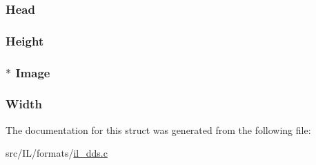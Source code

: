 \hypertarget{struct_d_d_s___c_o_n_t_e_x_t_a2bc50ce693cbf4803e197d1355bf300f}{
\subsubsection[{Head}]{ Head}}\label{struct_d_d_s___c_o_n_t_e_x_t_a2bc50ce693cbf4803e197d1355bf300f}
\hypertarget{struct_d_d_s___c_o_n_t_e_x_t_a6ab8e5a8c7842b5a57104e36b9a49f33}{
\subsubsection[{Height}]{ Height}}\label{struct_d_d_s___c_o_n_t_e_x_t_a6ab8e5a8c7842b5a57104e36b9a49f33}
\hypertarget{struct_d_d_s___c_o_n_t_e_x_t_a3886f625b62940075991f33d913127d0}{
\subsubsection[{Image}]{$\ast$ Image}}\label{struct_d_d_s___c_o_n_t_e_x_t_a3886f625b62940075991f33d913127d0}
\hypertarget{struct_d_d_s___c_o_n_t_e_x_t_a0bebc214dbd5f199ad36aefd13feb6e7}{
\subsubsection[{Width}]{ Width}}\label{struct_d_d_s___c_o_n_t_e_x_t_a0bebc214dbd5f199ad36aefd13feb6e7}


The documentation for this struct was generated from the following file\-:\begin{DoxyCompactItemize}
\item 
src/\-I\-L/formats/\hyperlink{il__dds_8c}{il\-\_\-dds.\-c}\end{DoxyCompactItemize}
